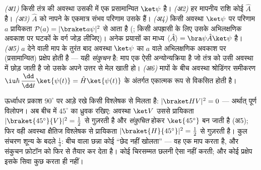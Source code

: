 \begin{theorem}[क्वांटम यांत्रिकी के नियम]\label{thm:b3:quantum-formalism:postulates}
\emph{(अ1)} किसी तंत्र की अवस्था उसकी  में एक
प्रसामान्यित  $\ket\psi$ है।
\emph{(अ2)} हर मापनीय राशि कोई 
$\hat A$ है।
\emph{(अ3)} $\hat A$ को नापने के एकमात्र संभव परिणाम उसके
 हैं।
\emph{(अ4)} किसी अवस्था $\ket\psi$ पर परिणाम $a$ प्रायिकता
$\mathcal P(a) = |\braket a\psi|^2$ से आता है (; किसी
अपह्रासी  के लिए उसके अभिलक्षणिक अवकाश पर घटकों के वर्ग
जोड़ लीजिए)। अनेक प्रयासों का माध्य $\langle\hat A\rangle =
\bra\psi\hat A\ket\psi$ है।
\emph{(अ5)} $a$ देने वाली माप के तुरंत बाद अवस्था
$\ket\psi$ का $a$ वाले अभिलक्षणिक अवकाश पर (प्रसामान्यित) प्रक्षेप होती
है --- यही \emph{संकुचन} है: माप एक ऐसी अन्योन्यक्रिया है जो तंत्र को
उसी अवस्था में छोड़ जाती है जो उसके अपने उत्तर से मेल खाती हो।
\emph{(अ6)} मापों के बीच अवस्था श्रोडिंगर समीकरण
$\iu\hbar\,\dfrac{\dd}{\dd t}\ket{\psi(t)} = \hat H\ket{\psi(t)}$
के अंतर्गत एकात्मक रूप से विकसित होती है।
\end{theorem}
\admitted

\begin{example}[तीन ध्रुवक, गणना सहित]\label{ex:b3:quantum-formalism:threepolarizers}
ऊर्ध्वाधर प्रकाश $90^\circ$ पर आड़े रखे किसी विश्लेषक से मिलता है: $|\braket
HV|^2 = 0$ --- अर्थात् पूर्ण विलोपन। अब बीच में $45^\circ$ का ध्रुवक
रखिए: अवस्था $\ket V$ उससे प्रायिकता $|\braket{45^\circ}{V}|^2 =
\tfrac12$ से गुज़रती है और \emph{संकुचित} होकर $\ket{45^\circ}$ बन जाती
है (अ5); फिर वही अवस्था क्षैतिज विश्लेषक से प्रायिकता
$|\braket{H}{45^\circ}|^2 = \tfrac12$ से गुज़रती है। कुल संचरण
शून्य के बदले $\tfrac14$: बीच वाला छन्ना कोई ``छेद नहीं खोलता'' ---
वह एक माप करता है, और संकुचन फ़ोटॉन को फिर से तैयार कर देता है। कोई
चिरसम्मत छलनी ऐसा नहीं करती; और कोई प्रक्षेप इसके सिवा कुछ करता ही नहीं।
\end{example}

